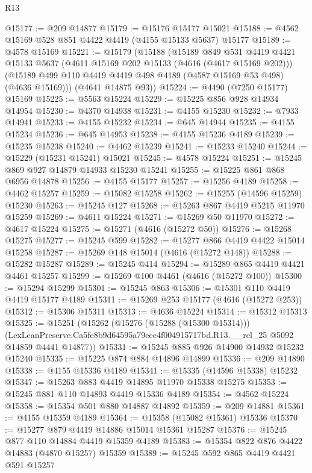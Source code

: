 \begin{lexlean}{R13}
\begin{coremodule}
@15177 := @209 @14877
@15179 := @15176 @15177 @15021
@15188 := @4562 @15169 @528 @851 @4422 @4419 (@4155 @15133 @5637) @15177
@15189 := @4578 @15169
@15221 := @15179
    (@15188
      (@15189
        @849
        @531
        @4419
        @4421
        @15133
        @5637
        (@4611 @15169 @202 @15133 (@4616 (@4617 @15169 @202)))
        (@15189 @499 @110 @4419 @4419 @498 @4189 (@4587 @15169 @53 @498) (@4636 @15169)))
      (@4641 @14875 @93))
@15224 := @4490 (@7250 @15177) @15169
@15225 := @5563 @15224
@15229 := @15225 @856 @928 @14934 @14954
@15230 := @4370 @14938
@15231 := @4155 @15230
@15232 := @7933 @14941
@15233 := @4155 @15232
@15234 := @645 @14944
@15235 := @4155 @15234
@15236 := @645 @14953
@15238 := @4155 @15236 @4189
@15239 := @15235 @15238
@15240 := @4462 @15239
@15241 := @15233 @15240
@15244 := @15229 (@15231 @15241) @15021
@15245 := @4578 @15224
@15251 := @15245 @869 @927 @14879 @14933 @15230 @15241
@15255 := @15225 @861 @868 @6956 @14878
@15256 := @4155 @15177
@15257 := @15256 @4189
@15258 := @4462 @15257
@15259 := @15082 @15258
@15262 := @15255 (@14596 @15259) @15230
@15263 := @15245 @127
@15268 := @15263 @867 @4419 @5215 @11970 @15259
@15269 := @4611 @15224
@15271 := @15269 @50 @11970
@15272 := @4617 @15224
@15275 := @15271 (@4616 (@15272 @50))
@15276 := @15268 @15275
@15277 := @15245 @599
@15282 := @15277 @866 @4419 @4422 @15014 @15258
@15287 := @15269 @148 @15014 (@4616 (@15272 @148))
@15288 := @15282 @15287
@15289 := @15245 @414
@15294 := @15289 @865 @4419 @4421 @4461 @15257
@15299 := @15269 @100 @4461 (@4616 (@15272 @100))
@15300 := @15294 @15299
@15301 := @15245 @863
@15306 := @15301 @110 @4419 @4419 @15177 @4189
@15311 := @15269 @253 @15177 (@4616 (@15272 @253))
@15312 := @15306 @15311
@15313 := @4636 @15224
@15314 := @15312 @15313
@15325 := @15251
    (@15262
      (@15276 (@15288 (@15300 @15314)))
      (LexLeanPreserve.Ca5fe8b9d64595a79eee4f004915717bd.R13.__rel_25 @5092 @14859 @4441 @14877))
@15331 := @15245 @885 @926 @14900 @14932 @15232 @15240
@15335 := @15225 @874 @884 @14896 @14899
@15336 := @209 @14890
@15338 := @4155 @15336 @4189
@15341 := @15335 (@14596 @15338) @15232
@15347 := @15263 @883 @4419 @14895 @11970 @15338 @15275
@15353 := @15245 @881 @110 @14893 @4419 @15336 @4189
@15354 := @4562 @15224
@15358 := @15354 @501 @880 @14887 @14892
@15359 := @209 @14881
@15361 := @4155 @15359 @4189
@15364 := @15358 (@15082 @15361) @15336
@15370 := @15277 @879 @4419 @14886 @15014 @15361 @15287
@15376 := @15245 @877 @110 @14884 @4419 @15359 @4189
@15383 := @15354 @822 @876 @4422 @14883 (@4870 @15257) @15359
@15389 := @15245 @592 @865 @4419 @4421 @591 @15257

\end{coremodule}
\end{lexlean}
